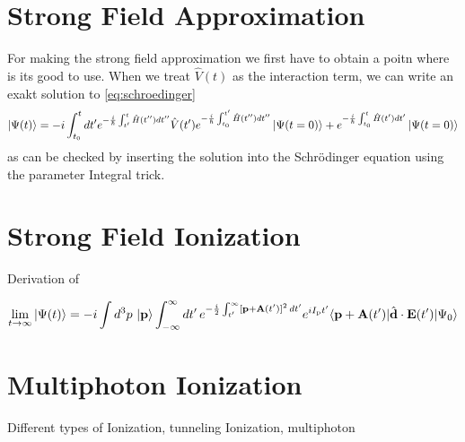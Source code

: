 \newpage
\section{Strong Field Approximation}

For making the strong field approximation we first have to obtain a poitn where is its good to use. 
When we treat $\hat{V}(t)$ as the interaction term, we can write an exakt solution to \eqref{eq:schroedinger}
\begin{equation}
    \ket{\Psi(t)} = -i \int_{t_0}^{t} dt' e^{-\frac{i}{\hbar} \int_{t'}^{t} \hat{H}(t'') dt''} \hat{V}(t') e^{-\frac{i}{\hbar} \int_{t_0}^{t'} \hat{H}(t'') dt''} \ket{\Psi(t=0)} + e^{-\frac{i}{\hbar} \int_{t_0}^{t} \hat{H}(t') dt'} \ket{\Psi(t=0)}
\end{equation}
as can be checked by inserting the solution into the Schrödinger equation using the parameter Integral trick.





\newpage
\section{Strong Field Ionization}

Derivation of 

\begin{equation}
    \lim_{t \to \infty} \ket{\Psi(t)}  = -i \int d^3 p\, \ket{\mathbf{p}} \int_{-\infty}^{\infty} dt'\, e^{-\frac{i}{2}\int_{t'}^{\infty} [\mathbf{p}+\mathbf{A}(t')]^2 \, dt'} e^{i I_\mathrm{p} t'} \langle \mathbf{p} + \mathbf{A}(t') | \hat{\mathbf{d}} \cdot \mathbf{E}(t') | \Psi_0 \rangle
\end{equation}





\newpage
\section{Multiphoton Ionization}

Different types of Ionization, tunneling Ionization, multiphoton